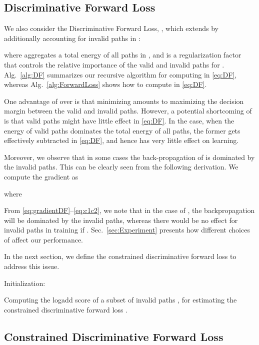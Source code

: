 \documentclass[10pt,twocolumn,letterpaper]{article}
\begin{document}
\subsection{Discriminative Forward Loss}
We also consider the Discriminative Forward Loss, , which extends  by additionally accounting for invalid paths in :

where  aggregates  a total energy of all paths in , and   is a regularization factor that controls the relative importance of the valid and invalid paths for . Alg.~\ref{alg:DF} summarizes our recursive algorithm for computing  in \eqref{eq:DF}, whereas Alg.~\ref{alg:ForwardLoss} shows how to compute  in \eqref{eq:DF}.  

One advantage of  over  is that minimizing  amounts to  maximizing the decision margin between the valid and invalid paths. However, a potential shortcoming of  is that valid paths might have little effect in \eqref{eq:DF}. In the case, when the energy of valid paths dominates the total energy of all paths, the former gets effectively subtracted in \eqref{eq:DF}, and hence has very little effect on learning. 

Moreover, we observe that in some cases the back-propagation of  is dominated by the invalid paths. This can be clearly seen from the following derivation. We compute the gradient   as

where

From \eqref{eq:gradientDF}--\eqref{eq:c1c2}, we note that in the case of , the backpropagation will be dominated by the invalid paths, whereas there would be no effect for invalid paths in training if . Sec.~\ref{sec:Experiment} presents how different choices of  affect our performance.

In the next section, we define the constrained discriminative forward loss to address this issue.


\begin{algorithm}[t]
\SetAlgoLined
\KwIn{}
\KwOut{ }
Initialization:  \;
\caption{Computing the logadd score of a subset of invalid paths , for estimating the constrained discriminative forward loss .}
\label{alg:CDF}
\end{algorithm}





\subsection{Constrained Discriminative Forward Loss}
\end{document}
